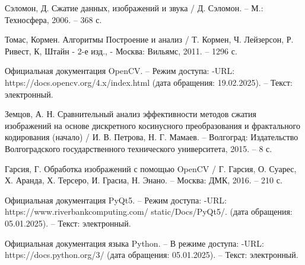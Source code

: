 \begin{thebibliography}{9}

     Сэломон, Д. Сжатие данных, изображений и звука / Д. Сэломон. – М.: Техносфера, 2006. –
    368 с.



     Томас, Кормен. Алгоритмы Построение и анализ / Т. Кормен,  Ч. Лейзерсон, Р. Ривест, К, Штайн 
    - 2-е изд., - Москва: Вильямс, 2011. -- 1296 с.


     Официальная документация OpenCV. – Режим доступа: -URL: https://docs.opencv.org/4.x/index.html (дата обращения: 19.02.2025). – Текст: электронный.


     Земцов, А. Н. Сравнительный анализ эффективности методов сжатия изображений на основе дискретного косинусного преобразования и фрактального кодирования (начало) /
    И. В. Петрова, Н. Г. Мамаев. –  Волгоград: Издательство Волгоградского государственного технического университета, 2015. – 8 с.

     Гарсия, Г. Обработка изображений с помощью OpenCV / Г. Гарсия, О. Суарес, Х. Аранда, Х. Терсеро, И. Грасиа, Н. Энано.
    – Москва: ДМК, 2016. – 210 с.


    
     Официальная документация PyQt5. – Режим доступа: -URL: https://www.riverbankcomputing.com/ static/Docs/PyQt5/. (дата обращения: 05.01.2025). – Текст: электронный.

     Официальная документация языка Python. – В режиме доступа: -URL: https://docs.python.org/3/ (дата обращения: 05.01.2025). – Текст: электронный.
    
    \end{thebibliography}